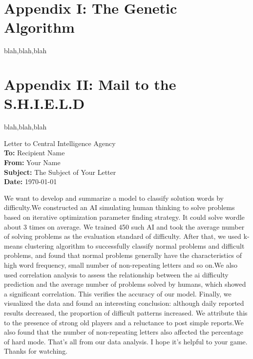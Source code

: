 \documentclass[12pt]{article}  %
\begin{document}
\appendix
\section{Appendix I: The Genetic Algorithm}
blah,blah,blah

\section{Appendix II: Mail to the S.H.I.E.L.D}
blah,blah,blah






\clearpage
\pagestyle{fancy}
\fancyhead{} %
\begin{letter}{Letter to Central Intelligence Agency}
	\textbf{}\\
	\textbf{To:} Recipient Name \\
	\textbf{From:} Your Name \\
	\textbf{Subject:} The Subject of Your Letter \\
	\textbf{Date:} \today \\
	\textbf{}
	\begin{multicols}{2}
	We want to develop and summarize a model to classify solution words by difficulty.We constructed an AI
	simulating human thinking to solve problems based
	on iterative optimization parameter finding strategy.
	It could solve wordle about 3 times on average. We
	trained 450 such AI and took the average number of
	solving problems as the evaluation standard of difficulty. After that, we used k-means clustering algorithm
	to successfully classify normal problems and difficult
	problems, and found that normal problems generally
	have the characteristics of high word frequency, small
	number of non-repeating letters and so on.We also used
	correlation analysis to assess the relationship between
	the ai difficulty prediction and the average number
	of problems solved by humans, which showed a significant correlation. This verifies the accuracy of our
	model.
	Finally, we visualized the data and found an interesting conclusion: although daily reported results decreased, the proportion of difficult patterns increased.
	We attribute this to the presence of strong old players
	and a reluctance to post simple reports.We also found
	that the number of non-repeating letters also affected
	the percentage of hard mode.
	That’s all from our data analysis. I hope it’s helpful
	to your game. Thanks for watching.
	\end{multicols}
	
\end{letter}




\setcounter{savedpage}{\value{page}}
 
\setcounter{page}{\value{savedpage}}
\end{document}
